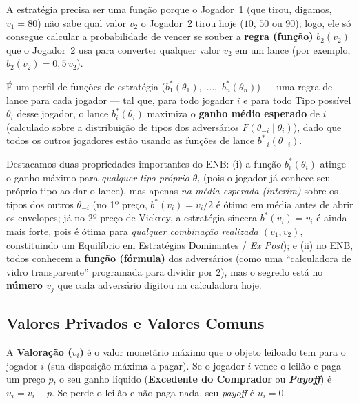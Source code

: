 A estratégia precisa ser uma função porque o Jogador~1 (que tirou, digamos, $v_1 = 80$) não sabe qual valor $v_2$ o Jogador~2 tirou hoje ($10$, $50$ ou $90$); logo, ele só consegue calcular a probabilidade de vencer se souber a \textbf{regra (função)} $b_2(v_2)$ que o Jogador~2 usa para converter qualquer valor $v_2$ em um lance (por exemplo, $b_2(v_2) = 0{,}5\,v_2$).

\begin{definicao}
\label{def:enb}
É um perfil de funções de estratégia ($b_1^*(\theta_1),$ $\dots,$ $b_n^*(\theta_n)$) --- uma regra de lance para cada jogador --- tal que, para todo jogador $i$ e para todo Tipo possível $\theta_i$ desse jogador, o lance $b_i^*(\theta_i)$ maximiza o \textbf{ganho médio esperado} de $i$ (calculado sobre a distribuição de tipos dos adversários $F(\theta_{-i} \mid \theta_i)$), dado que todos os outros jogadores estão usando as funções de lance $b_{-i}^*(\theta_{-i})$.
\end{definicao}

Destacamos duas propriedades importantes do ENB: (i) a função $b_i^*(\theta_i)$ atinge o ganho máximo para \textit{qualquer tipo próprio $\theta_i$} (pois o jogador já conhece seu próprio tipo ao dar o lance), mas apenas \textit{na média esperada (\textit{interim})} sobre os tipos dos outros $\theta_{-i}$ (no 1º preço, $b^*(v_i) = v_i/2$ é ótimo em média antes de abrir os envelopes; já no 2º preço de Vickrey, a estratégia sincera $b^*(v_i) = v_i$ é ainda mais forte, pois é ótima para \textit{qualquer combinação realizada $(v_1, v_2)$}, constituindo um Equilíbrio em Estratégias Dominantes / \textit{Ex Post}); e (ii) no ENB, todos conhecem a \textbf{função (fórmula)} dos adversários (como uma ``calculadora de vidro transparente'' programada para dividir por 2), mas o segredo está no \textbf{número $v_j$} que cada adversário digitou na calculadora hoje.

\subsection{Valores Privados e Valores Comuns}
\label{subsec:valores_privados_comuns}

\begin{definicao}
\label{def:valoracao_payoff}
A \textbf{Valoração ($v_i$)} é o valor monetário máximo que o objeto leiloado tem para o jogador $i$ (sua disposição máxima a pagar). Se o jogador $i$ vence o leilão e paga um preço $p$, o seu ganho líquido (\textbf{Excedente do Comprador} ou \textbf{\textit{Payoff}}) é $u_i = v_i - p$. Se perde o leilão e não paga nada, seu \textit{payoff} é $u_i = 0$.
\end{definicao}

